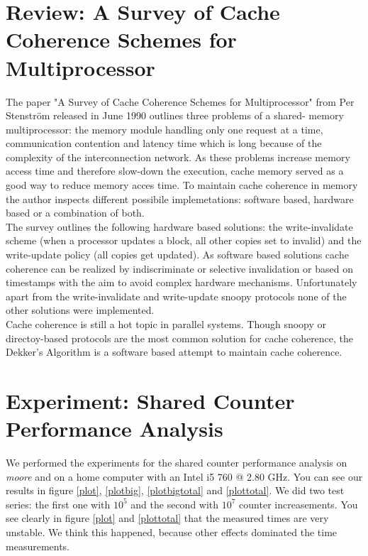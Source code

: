 \documentclass[DIV=12,oneside,a4paper]{scrartcl}
\begin{document}
\section{Review: A Survey of Cache Coherence Schemes for Multiprocessor}
The paper "A Survey of Cache Coherence Schemes for Multiprocessor" from
Per Stenström released in June 1990 outlines three problems of a shared-
memory multiprocessor: the memory module handling only one request at 
a time, communication contention and latency time which is long because 
of the complexity of the interconnection network. As these problems 
increase memory access time and therefore slow-down the execution, cache 
memory served as a good way to reduce memory acces time. To maintain 
cache coherence in memory the author inspects different possibile 
implemetations: software based, hardware based or a combination of both.
\\
The survey outlines the following hardware based solutions: the 
write-invalidate scheme (when a processor updates a block, all other 
copies set to invalid) and the write-update policy (all copies get updated). 
As software based solutions cache coherence can be realized by indiscriminate 
or selective invalidation or based on timestamps with the aim to avoid 
complex hardware mechanisms. Unfortunately apart from the write-invalidate 
and write-update snoopy protocols none of the other solutions were 
implemented. 
\\
Cache coherence is still a hot topic in parallel systems. Though snoopy
or directoy-based protocols are the most common solution for cache coherence, 
the Dekker's Algorithm is a software based attempt to maintain cache coherence.
    

\section{Experiment: Shared Counter Performance Analysis}
We performed the experiments for the shared counter performance
analysis on \emph{moore} and on a home computer with an Intel
i5 760 @ 2.80 GHz. You can see our results in figure \ref{plot}, \ref{plotbig},
\ref{plotbigtotal} and \ref{plottotal}. We did two test series: the first
one with $10^5$ and the second with $10^7$ counter increasements. You
see clearly in figure \ref{plot} and \ref{plottotal} that the measured
times are very unstable. We think this happened, because other effects
dominated the time measurements. 
\end{document}
